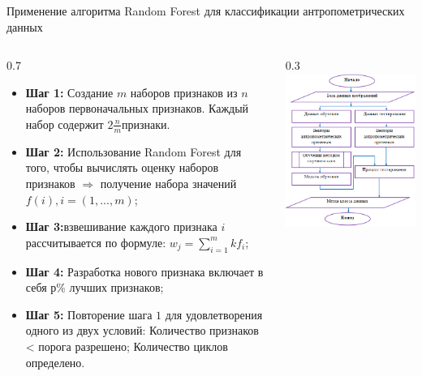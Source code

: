 \documentclass[10pt,pdf,hyperref={unicode},xcolor=table]{beamer}
\begin{document}
\begin{frame}{Применение алгоритма Random Forest для классификации антропометрических данных}
\begin{columns}
		\begin{column} {0.7\textwidth}			
\begin{itemize}
	\item \textbf{Шаг 1:} Создание $m$ наборов признаков из $n$ наборов первоначальных признаков. Каждый набор содержит $2 \frac{n}{m} $признаки. 	
	\item \textbf{Шаг 2:} Использование Random Forest для того, чтобы вычислять оценку наборов признаков $\Rightarrow$ получение набора значений $f\left(i\right), i= \left(1,..., m\right)$;
	\item \textbf{Шаг 3:}взвешивание каждого признака $i$ рассчитывается по формуле:
	$w_j= \sum^m_{i=1}kf_i$;	
	\item \textbf{Шаг 4:} Разработка нового признака включает в себя $р\%$ лучших признаков;
	\item \textbf{Шаг 5:} Повторение шага $1$ для удовлетворения одного из двух условий: Количество признаков < порога разрешено; Количество циклов определено.
	
\end{itemize}

			\end{column}
			\begin{column} {0.3\textwidth}
		\includegraphics[width=1\linewidth]{p12}
			\end{column}      
		\end{columns}
\end{frame}
\end{document}
